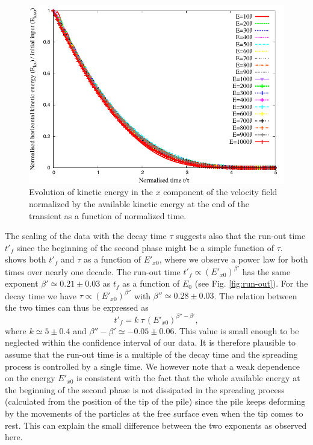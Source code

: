 \begin{figure}[tbhp]
\centering
\includegraphics[width=\textwidth]{EkxKoTTau_Slope}
\caption{Evolution of kinetic energy in the $x$ component of 
the velocity field  normalized by the available kinetic energy at the end of 
the transient as a function of normalized time.}
\label{fig:ExEx0_vs_ttau}
\end{figure}


The scaling of the data with the decay time $\tau$ suggests also that the 
run-out time $t'_f$ since the beginning of the second phase might be a simple 
function of $\tau$.~ shows both $t'_f$ and $\tau$ as 
a function of $E'_{x0}$, where we observe a power law for both times over 
nearly one decade. The run-out time $t'_f \propto (E'_{x0})^{\beta'}$ has the 
same exponent $\beta' \simeq 0.21 \pm 0.03$ as $t_f$ as a function of $E_0$ 
(see Fig. \ref{fig:run-out}). For the decay time we have 
$\tau \propto (E'_{x0})^{\beta''}$ with $\beta'' \simeq 0.28 \pm 0.03$. The 
relation between the two times can thus be expressed as 
\begin{equation}
t'_f = k  \ \tau \, (E'_{x0})^{\beta'' - \beta'}, 
\label{eqn:t'f}
\end{equation}
where $k \simeq 5 \pm 0.4$ and $\beta'' - \beta' \simeq -0.05 \pm 0.06$. This 
value is small enough to be neglected within the confidence interval of our 
data. It is therefore plausible to assume that  the run-out time is a multiple 
of the decay time and the spreading process is controlled by a single time. We 
however note that a weak dependence on the energy $E'_{x0}$  is consistent with 
the fact that the whole available energy at the beginning of the second phase 
is not dissipated in the spreading process (calculated from the position of the 
tip of the pile) since  the pile keeps deforming by the movements of the 
particles at the free surface even when the tip comes to rest. 
This can explain the small difference between the two exponents as observed 
here.

